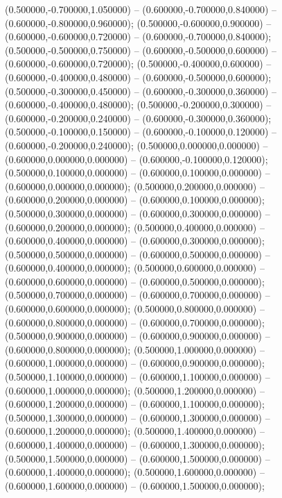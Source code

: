  (0.500000,-0.700000,1.050000) -- (0.600000,-0.700000,0.840000) -- (0.600000,-0.800000,0.960000);
 (0.500000,-0.600000,0.900000) -- (0.600000,-0.600000,0.720000) -- (0.600000,-0.700000,0.840000);
 (0.500000,-0.500000,0.750000) -- (0.600000,-0.500000,0.600000) -- (0.600000,-0.600000,0.720000);
 (0.500000,-0.400000,0.600000) -- (0.600000,-0.400000,0.480000) -- (0.600000,-0.500000,0.600000);
 (0.500000,-0.300000,0.450000) -- (0.600000,-0.300000,0.360000) -- (0.600000,-0.400000,0.480000);
 (0.500000,-0.200000,0.300000) -- (0.600000,-0.200000,0.240000) -- (0.600000,-0.300000,0.360000);
 (0.500000,-0.100000,0.150000) -- (0.600000,-0.100000,0.120000) -- (0.600000,-0.200000,0.240000);
 (0.500000,0.000000,0.000000) -- (0.600000,0.000000,0.000000) -- (0.600000,-0.100000,0.120000);
 (0.500000,0.100000,0.000000) -- (0.600000,0.100000,0.000000) -- (0.600000,0.000000,0.000000);
 (0.500000,0.200000,0.000000) -- (0.600000,0.200000,0.000000) -- (0.600000,0.100000,0.000000);
 (0.500000,0.300000,0.000000) -- (0.600000,0.300000,0.000000) -- (0.600000,0.200000,0.000000);
 (0.500000,0.400000,0.000000) -- (0.600000,0.400000,0.000000) -- (0.600000,0.300000,0.000000);
 (0.500000,0.500000,0.000000) -- (0.600000,0.500000,0.000000) -- (0.600000,0.400000,0.000000);
 (0.500000,0.600000,0.000000) -- (0.600000,0.600000,0.000000) -- (0.600000,0.500000,0.000000);
 (0.500000,0.700000,0.000000) -- (0.600000,0.700000,0.000000) -- (0.600000,0.600000,0.000000);
 (0.500000,0.800000,0.000000) -- (0.600000,0.800000,0.000000) -- (0.600000,0.700000,0.000000);
 (0.500000,0.900000,0.000000) -- (0.600000,0.900000,0.000000) -- (0.600000,0.800000,0.000000);
 (0.500000,1.000000,0.000000) -- (0.600000,1.000000,0.000000) -- (0.600000,0.900000,0.000000);
 (0.500000,1.100000,0.000000) -- (0.600000,1.100000,0.000000) -- (0.600000,1.000000,0.000000);
 (0.500000,1.200000,0.000000) -- (0.600000,1.200000,0.000000) -- (0.600000,1.100000,0.000000);
 (0.500000,1.300000,0.000000) -- (0.600000,1.300000,0.000000) -- (0.600000,1.200000,0.000000);
 (0.500000,1.400000,0.000000) -- (0.600000,1.400000,0.000000) -- (0.600000,1.300000,0.000000);
 (0.500000,1.500000,0.000000) -- (0.600000,1.500000,0.000000) -- (0.600000,1.400000,0.000000);
 (0.500000,1.600000,0.000000) -- (0.600000,1.600000,0.000000) -- (0.600000,1.500000,0.000000);
